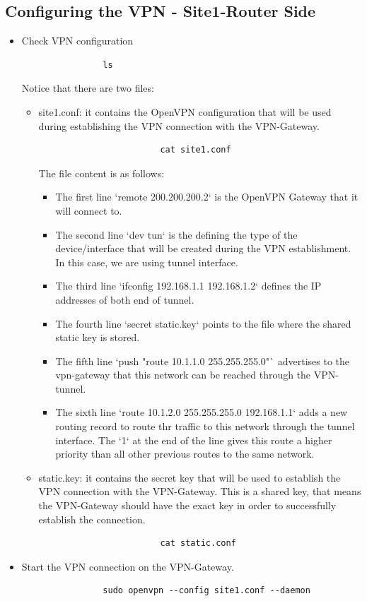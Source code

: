 \subsection{Configuring the VPN - Site1-Router Side}
\begin{itemize}
	\item Check VPN configuration

		\begin{verbatim}
				ls
		\end{verbatim}

		Notice that there are two files:

		\begin{itemize}
			\item site1.conf: it contains the OpenVPN  configuration that will be used during establishing the VPN connection with the VPN-Gateway.
				\begin{verbatim}
						cat site1.conf
				\end{verbatim}

				The file content is as follows:
					\begin{itemize}
						\item The first line `remote 200.200.200.2` is the OpenVPN Gateway that it will connect to.
						\item The second line `dev tun` is the defining the type of the device/interface that will be created during the VPN establishment. In this case, we are using tunnel interface.
						\item The third line `ifconfig 192.168.1.1 192.168.1.2` defines the IP addresses of both end of tunnel.
						\item The fourth line `secret static.key` points to the file where the shared static key is stored.
						\item The fifth line `push "route 10.1.1.0 255.255.255.0"` advertises to the vpn-gateway that this network can be reached through the VPN-tunnel.
						\item The sixth line `route 10.1.2.0 255.255.255.0 192.168.1.1` adds a new routing record to route thr traffic to this network through the tunnel interface. The `1` at the end of the line gives this route a higher priority than all other previous routes to the same network.
					\end{itemize}
			\item static.key: it contains the secret key that will be used to establish the VPN connection with the VPN-Gateway. This is a shared key, that means the VPN-Gateway should have the exact key in order to successfully establish the connection.
				\begin{verbatim}
						cat static.conf
				\end{verbatim}

		\end{itemize}

	\item Start the VPN connection on the VPN-Gateway.
		\begin{verbatim}
				sudo openvpn --config site1.conf --daemon
		\end{verbatim}
\end{itemize}


